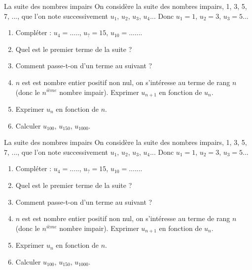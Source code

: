 \documentclass[12pt,a4paper]{article}
\date{}
\title{}
\begin{document}

%
%
%
%
%
%
%
%
%



\begin{myact}{La suite des nombres impairs}
	On considère la suite des nombres impairs, 1, 3, 5, 7, ..., que l'on note successivement $u_1$, $u_2$, $u_3$, $u_4$...
	Donc $u_1=1$, $u_2=3$, $u_3=5$...\\
	
	\begin{enumerate}
		\item Compléter : $u_4=.....$, $u_? =15$, $u_{10}=......$.
		\item Quel est le premier terme de la suite ?
		\item Comment passe-t-on d'un terme au suivant ?
		\item $n$ est est nombre entier positif non nul, on s'intéresse au terme de rang $n$ (donc le $n^{ième}$ nombre impair). Exprimer $u_{n+1}$ en fonction de $u_n$.
		\item Exprimer $u_n$ en fonction de $n$.
		\item Calculer $u_{100}$, $u_{150}$, $u_{1000}$.
	\end{enumerate}
	
\end{myact}

\begin{myact}{La suite des nombres impairs}
	On considère la suite des nombres impairs, 1, 3, 5, 7, ..., que l'on note successivement $u_1$, $u_2$, $u_3$, $u_4$...
	Donc $u_1=1$, $u_2=3$, $u_3=5$...\\
	
	\begin{enumerate}
		\item Compléter : $u_4=.....$, $u_? =15$, $u_{10}=......$.
		\item Quel est le premier terme de la suite ?
		\item Comment passe-t-on d'un terme au suivant ?
		\item $n$ est est nombre entier positif non nul, on s'intéresse au terme de rang $n$ (donc le $n^{ième}$ nombre impair). Exprimer $u_{n+1}$ en fonction de $u_n$.
		\item Exprimer $u_n$ en fonction de $n$.
		\item Calculer $u_{100}$, $u_{150}$, $u_{1000}$.
	\end{enumerate}
	
\end{myact}
\end{document}
